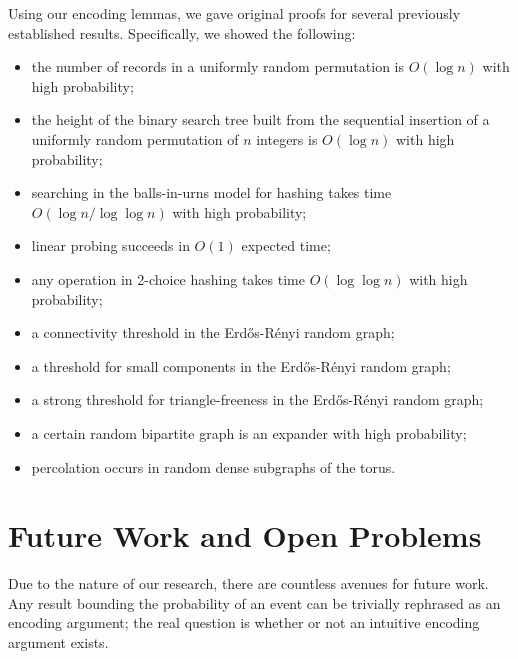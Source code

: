 Using our encoding lemmas, we gave original proofs for several
previously established results. Specifically, we showed the following:
\begin{itemize}
\item the number of records in a uniformly random permutation is
  $O(\log n)$ with high probability;
\item the height of the binary search tree built from the sequential
  insertion of a uniformly random permutation of $n$ integers is
  $O(\log n)$ with high probability;
\item searching in the balls-in-urns model for hashing takes time
  $O(\log n/\log \log n)$ with high probability;
\item linear probing succeeds in $O(1)$ expected time;
\item any operation in 2-choice hashing takes time $O(\log \log n)$
  with high probability;
\item a connectivity threshold in the Erd\H{o}s-R\'{e}nyi random
  graph;
\item a threshold for small components in the Erd\H{o}s-R\'{e}nyi
  random graph;
\item a strong threshold for triangle-freeness in the
  Erd\H{o}s-R\'{e}nyi random graph;
\item a certain random bipartite graph is an expander with high
  probability;
\item percolation occurs in random dense subgraphs of the torus.
\end{itemize}


\section{Future Work and Open Problems}

Due to the nature of our research, there are countless avenues for
future work. Any result bounding the probability of an event can be
trivially rephrased as an encoding argument; the real question is
whether or not an intuitive encoding argument exists.

